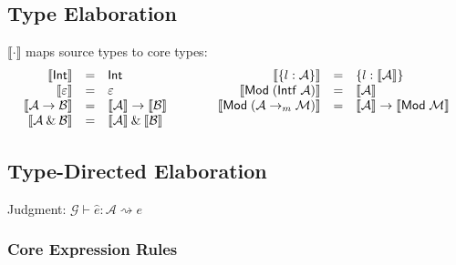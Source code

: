 \documentclass{article}
\newcommand{\tand}{\mathbin{\&}}
\newcommand{\tarr}{\rightarrow}
\newcommand{\lsem}{\llbracket}
\newcommand{\rsem}{\rrbracket}
\newcommand{\kw}[1]{\mathsf{#1}}
\newcommand{\shat}[1]{\hat{#1}}
\newcommand{\elmark}{\rightsquigarrow}
\begin{document}
\subsection{Type Elaboration}

$\lsem \cdot \rsem$ maps source types to core types:
\[
\begin{array}{rcl@{\qquad\qquad}rcl}
  \lsem \kw{Int} \rsem &=& \kw{Int}
    & \lsem \{l:\mathcal{A}\} \rsem &=& \{l:\lsem \mathcal{A} \rsem\} \\
  \lsem \varepsilon \rsem &=& \varepsilon
    & \lsem \kw{Mod}\;(\kw{Intf}\;\mathcal{A}) \rsem &=& \lsem \mathcal{A} \rsem \\
  \lsem \mathcal{A} \tarr \mathcal{B} \rsem &=& \lsem \mathcal{A} \rsem \tarr \lsem \mathcal{B} \rsem
    & \lsem \kw{Mod}\;(\mathcal{A} \tarr_m \mathcal{M}) \rsem &=& \lsem \mathcal{A} \rsem \tarr \lsem \kw{Mod}\;\mathcal{M} \rsem \\
  \lsem \mathcal{A} \tand \mathcal{B} \rsem &=& \lsem \mathcal{A} \rsem \tand \lsem \mathcal{B} \rsem
\end{array}
\]


\subsection{Type-Directed Elaboration}

Judgment: $\boxed{\mathcal{G} \vdash \shat{e} : \mathcal{A} \elmark e}$

\subsubsection*{Core Expression Rules}
\end{document}
